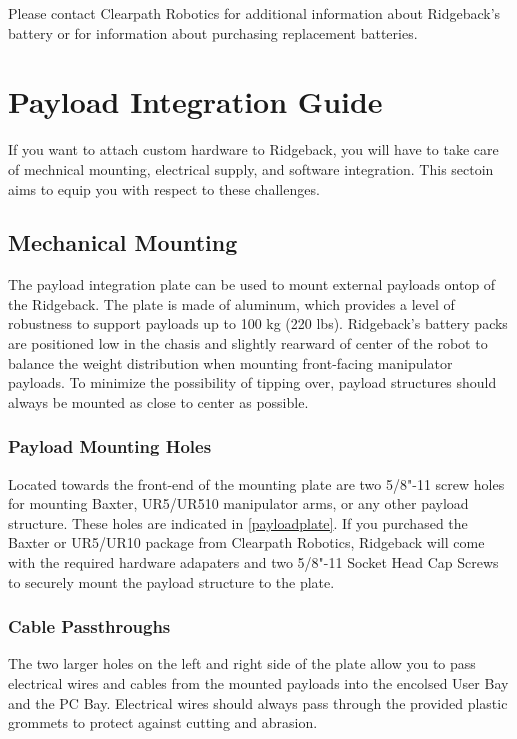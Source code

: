 \documentclass[]{clearpath-latex/clearpath-manual}
\begin{document}
Please contact Clearpath Robotics for additional information about Ridgeback's battery or for information about purchasing replacement batteries.

\section{Payload Integration Guide}

If you want to attach custom hardware to Ridgeback, you will have to take care of mechnical mounting, electrical supply, and software integration.  This sectoin aims to equip you with respect to these challenges.

\subsection{Mechanical Mounting}
\label{mechanical}

The payload integration plate can be used to mount external payloads ontop of the Ridgeback.   The plate is made of aluminum, which provides a level of robustness to support payloads up to 100 kg (220 lbs).   Ridgeback's battery packs are positioned low in the chasis and slightly rearward of center of the robot to balance the weight distribution when mounting front-facing manipulator payloads. To minimize the possibility of tipping over, payload structures should always be mounted as close to center as possible. 

\subsubsection{Payload Mounting Holes}

Located towards the front-end of the mounting plate are two 5/8"-11 screw holes for mounting Baxter, UR5/UR510 manipulator arms, or any other payload structure.  These holes are indicated in \autoref{payloadplate}. If you purchased the Baxter or UR5/UR10 package from Clearpath Robotics, Ridgeback will come with the required hardware adapaters and two 5/8"-11 Socket Head Cap Screws to securely mount the payload structure to the plate.  

\subsubsection{Cable Passthroughs}

The two larger holes on the left and right side of the plate allow you to pass electrical wires and cables from the mounted payloads into the encolsed User Bay and the PC Bay.  Electrical wires should always pass through the provided plastic grommets to protect against cutting and abrasion. 
\end{document}
